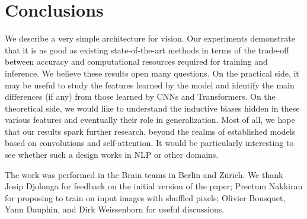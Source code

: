 \section{Conclusions}
We describe a very simple architecture for vision.
Our experiments demonstrate that it is as good as existing state-of-the-art methods in terms of the trade-off between accuracy and computational resources required for training and inference.
We believe these results open many questions.
On the practical side, it may be useful to study the features learned by the model and identify the main differences (if any) from those learned by CNNs and Transformers.
On the theoretical side, we would like to understand the inductive biases hidden in these various features and eventually their role in generalization.
Most of all, we hope that our results spark further research, beyond the realms of established models based on convolutions and self-attention.
It would be particularly interesting to see whether such a design works in NLP or other domains.

\begin{ack}
The work was performed in the Brain teams in Berlin and Z\"urich.
We thank
Josip Djolonga for feedback on the initial version of the paper; 
Preetum Nakkiran for proposing to train \fullname{} on input images with shuffled pixels;
Olivier Bousquet, Yann Dauphin, and Dirk Weissenborn for useful discussions.
\end{ack}
